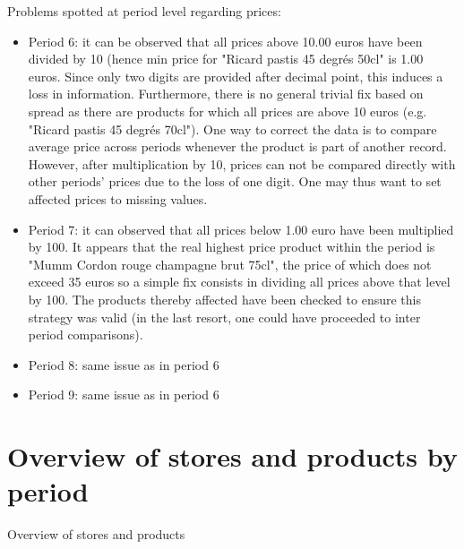 \documentclass[11pt]{article}
\begin{document}
{Problems spotted at period level regarding prices:
\begin{itemize}
\item Period 6: it can be observed that all prices above 10.00 euros have been divided by 10 (hence min price for "Ricard pastis 45 degrés 50cl" is 1.00 euros. Since only two digits are provided after decimal point, this induces a loss in information. Furthermore, there is no general trivial fix based on spread as there are products for which all prices are above 10 euros (e.g. "Ricard pastis 45 degrés 70cl"). One way to correct the data is to compare average price across periods whenever the product is part of another record. However, after multiplication by 10, prices can not be compared directly with other periods' prices due to the loss of one digit. One may thus want to set affected prices to missing values.
\item Period 7:  it can observed that all prices below 1.00 euro have been multiplied by 100. It appears that the real highest price product within the period is "Mumm Cordon rouge champagne brut 75cl", the price of which does not exceed 35 euros so a simple fix consists in dividing all prices above that level by 100. The products thereby affected have been checked to ensure this strategy was valid (in the last resort, one could have proceeded to inter period comparisons).
\item Period 8: same issue as in period 6
\item Period 9: same issue as in period 6
\end{itemize}

\section{Overview of stores and products by period}

\begin{table}[H]
\renewcommand{\arraystretch}{0.7}%
\caption{Overview of stores and products}
\small


\end{table}}
\end{document}
